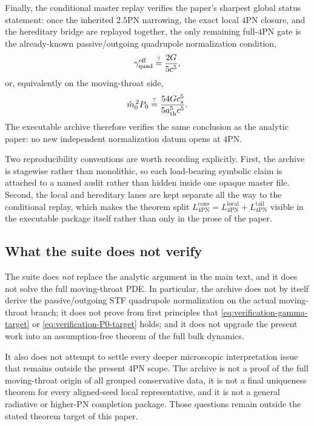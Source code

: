 \documentclass[11pt]{article}
\begin{document}
Finally, the conditional master replay verifies the paper's sharpest global
status statement: once the inherited $2.5$PN narrowing, the exact local $4$PN
closure, and the hereditary bridge are replayed together, the only remaining
full-$4$PN gate is the already-known passive/outgoing quadrupole normalization
condition,
\begin{equation}
\gamma_{\rm quad}^{\rm eff}\stackrel{?}{=}\frac{2G}{5c^5},
\label{eq:verification-gamma-target}
\end{equation}
or, equivalently on the moving-throat side,
\begin{equation}
\hat m_0^{\,2}P_0\stackrel{?}{=}\frac{54Gc_s^5}{5a_{\rm th}^5c^5}.
\label{eq:verification-P0-target}
\end{equation}
The executable archive therefore verifies the same conclusion as the analytic
paper: no new independent normalization datum opens at $4$PN.

Two reproducibility conventions are worth recording explicitly.  First, the
archive is stagewise rather than monolithic, so each load-bearing symbolic claim
is attached to a named audit rather than hidden inside one opaque master file.
Second, the local and hereditary lanes are kept separate all the way to the
conditional replay, which makes the theorem split
\(
L_{4\mathrm{PN}}^{\mathrm{cons}}=L_{4\mathrm{PN}}^{\mathrm{local}}+L_{4\mathrm{PN}}^{\mathrm{tail}}
\)
visible in the executable package itself rather than only in the prose of the
paper.

\subsection{What the suite does not verify}
\label{sec:verification-does-not-verify}

The suite does \emph{not} replace the analytic argument in the main text, and it
does not solve the full moving-throat PDE.  In particular, the archive does not
by itself derive the passive/outgoing STF quadrupole normalization on the actual
moving-throat branch; it does not prove from first principles that
\eqref{eq:verification-gamma-target} or \eqref{eq:verification-P0-target}
holds; and it does not upgrade the present work into an assumption-free theorem
of the full bulk dynamics.

It also does not attempt to settle every deeper microscopic interpretation issue
that remains outside the present $4$PN scope.  The archive is not a proof of the
full moving-throat origin of all grouped conservative data, it is not a final
uniqueness theorem for every aligned-seed local representative, and it is not a
general radiative or higher-PN completion package.  Those questions remain
outside the stated theorem target of this paper.
\end{document}
